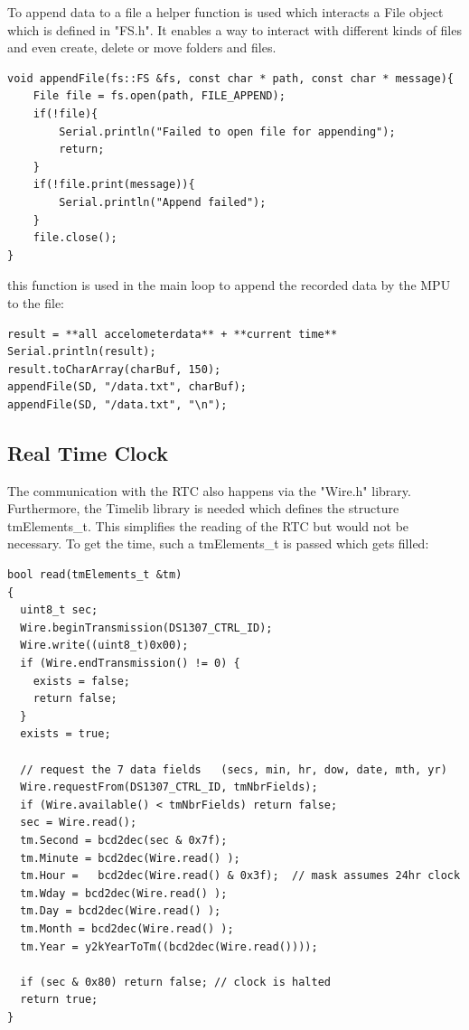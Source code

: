 To append data to a file a helper function is used which interacts a File object which is defined in "FS.h". It enables a way to interact with different kinds of files and even create, delete or move folders and files.

\begin{lstlisting}
void appendFile(fs::FS &fs, const char * path, const char * message){
    File file = fs.open(path, FILE_APPEND);
    if(!file){
        Serial.println("Failed to open file for appending");
        return;
    }
    if(!file.print(message)){
        Serial.println("Append failed");
    }
    file.close();
}
\end{lstlisting}
\cite{BlogofWe42:online}
this function is used in the main loop to append the recorded data by the MPU to the file: 
\begin{lstlisting}
result = **all accelometerdata** + **current time**
Serial.println(result);
result.toCharArray(charBuf, 150);
appendFile(SD, "/data.txt", charBuf);
appendFile(SD, "/data.txt", "\n");
\end{lstlisting}


\subsection{Real Time Clock}

The communication with the RTC also happens via the "Wire.h" library. Furthermore, the Timelib library is needed which defines the structure tmElements\_t. This simplifies the reading of the RTC but would not be necessary. To get the time, such a tmElements\_t is passed which gets filled:
\begin{lstlisting}
bool read(tmElements_t &tm)
{
  uint8_t sec;
  Wire.beginTransmission(DS1307_CTRL_ID);
  Wire.write((uint8_t)0x00); 
  if (Wire.endTransmission() != 0) {
    exists = false;
    return false;
  }
  exists = true;

  // request the 7 data fields   (secs, min, hr, dow, date, mth, yr)
  Wire.requestFrom(DS1307_CTRL_ID, tmNbrFields);
  if (Wire.available() < tmNbrFields) return false;
  sec = Wire.read();
  tm.Second = bcd2dec(sec & 0x7f);   
  tm.Minute = bcd2dec(Wire.read() );
  tm.Hour =   bcd2dec(Wire.read() & 0x3f);  // mask assumes 24hr clock
  tm.Wday = bcd2dec(Wire.read() );
  tm.Day = bcd2dec(Wire.read() );
  tm.Month = bcd2dec(Wire.read() );
  tm.Year = y2kYearToTm((bcd2dec(Wire.read())));

  if (sec & 0x80) return false; // clock is halted
  return true;
}
\end{lstlisting}
\cite{DS1307RT51:online}

